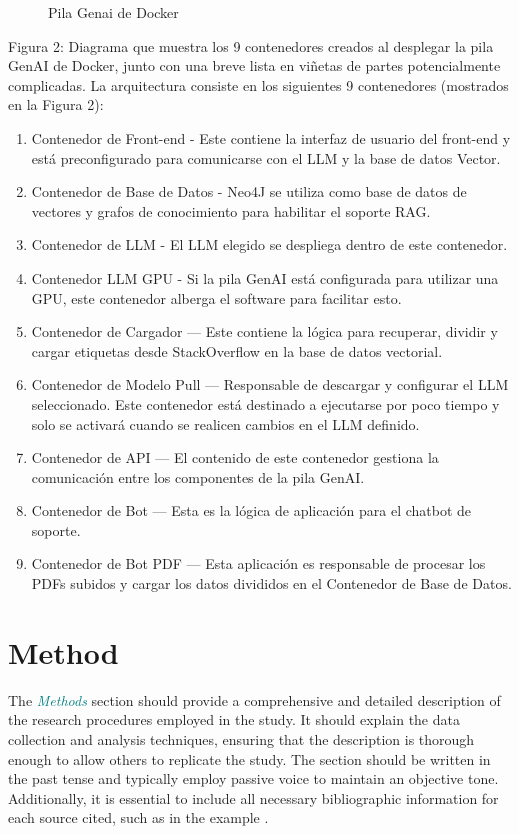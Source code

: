 \documentclass{article}
\begin{document}
\begin{figure}[ht]
 \centering
 \caption{Pila Genai de Docker}
 \label{fig-2}
\end{figure}

Figura 2: Diagrama que muestra los 9 contenedores creados al desplegar la pila GenAI de Docker, junto con una breve lista en viñetas de partes potencialmente complicadas.
La arquitectura consiste en los siguientes 9 contenedores (mostrados en la Figura 2):

\begin{enumerate}

\item Contenedor de Front-end - Este contiene la interfaz de usuario del front-end y está preconfigurado para comunicarse con el LLM y la base de datos Vector.
\item Contenedor de Base de Datos - Neo4J se utiliza como base de datos de vectores y grafos de conocimiento para habilitar el soporte RAG.
\item Contenedor de LLM - El LLM elegido se despliega dentro de este contenedor.
\item Contenedor LLM GPU - Si la pila GenAI está configurada para utilizar una GPU, este contenedor alberga el software para facilitar esto.
\item Contenedor de Cargador — Este contiene la lógica para recuperar, dividir y cargar etiquetas desde StackOverflow en la base de datos vectorial.
\item Contenedor de Modelo Pull — Responsable de descargar y configurar el LLM seleccionado. Este contenedor está destinado a ejecutarse por poco tiempo y solo se activará cuando se realicen cambios en el LLM definido.
\item Contenedor de API — El contenido de este contenedor gestiona la comunicación entre los componentes de la pila GenAI.
\item Contenedor de Bot — Esta es la lógica de aplicación para el chatbot de soporte.
\item Contenedor de Bot PDF — Esta aplicación es responsable de procesar los PDFs subidos y cargar los datos divididos en el Contenedor de Base de Datos.
\end{enumerate}

\section{Method}
\label{sec:method}
The \textcolor{teal}{\textit{Methods}} section should provide a comprehensive and detailed description of the research procedures employed in the study. 
It should explain the data collection and analysis techniques, ensuring that the description is thorough enough to allow others to replicate the study. 
The section should be written in the past tense and typically employ passive voice to maintain an objective tone. 
Additionally, it is essential to include all necessary bibliographic information for each source cited, such as in the example \cite{fellows_research_2021}.
\end{document}
